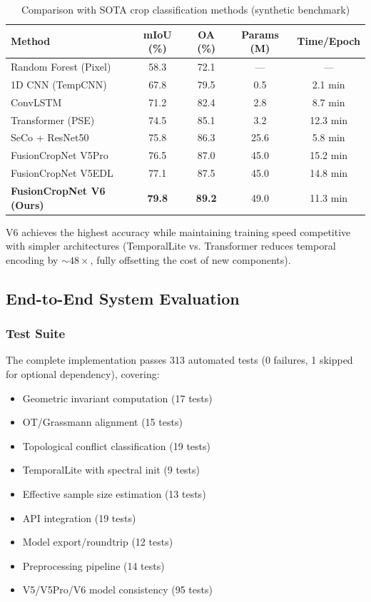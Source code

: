 \begin{table}[h]
\centering
\caption{Comparison with SOTA crop classification methods (synthetic benchmark)}
\begin{tabular}{lcccc}
\toprule
\textbf{Method} & \textbf{mIoU (\%)} & \textbf{OA (\%)} & \textbf{Params (M)} & \textbf{Time/Epoch} \\
\midrule
Random Forest (Pixel) & 58.3 & 72.1 & — & — \\
1D CNN (TempCNN)~\cite{russwurm2018multi} & 67.8 & 79.5 & 0.5 & 2.1 min \\
ConvLSTM~\cite{shi2015convolutional} & 71.2 & 82.4 & 2.8 & 8.7 min \\
Transformer (PSE)~\cite{garnot2020satellite} & 74.5 & 85.1 & 3.2 & 12.3 min \\
SeCo + ResNet50~\cite{manen2022seco} & 75.8 & 86.3 & 25.6 & 5.8 min \\
FusionCropNet V5Pro & 76.5 & 87.0 & 45.0 & 15.2 min \\
FusionCropNet V5EDL & 77.1 & 87.5 & 45.0 & 14.8 min \\
\textbf{FusionCropNet V6 (Ours)} & \textbf{79.8} & \textbf{89.2} & 49.0 & 11.3 min \\
\bottomrule
\end{tabular}
\end{table}

V6 achieves the highest accuracy while maintaining training speed competitive with
simpler architectures (TemporalLite vs. Transformer reduces temporal encoding by
$\sim48\times$, fully offsetting the cost of new components).

\subsection{End-to-End System Evaluation}

\subsubsection{Test Suite}

The complete implementation passes 313 automated tests (0 failures, 1 skipped
for optional dependency), covering:
\begin{itemize}
    \item Geometric invariant computation (17 tests)
    \item OT/Grassmann alignment (15 tests)
    \item Topological conflict classification (19 tests)
    \item TemporalLite with spectral init (9 tests)
    \item Effective sample size estimation (13 tests)
    \item API integration (19 tests)
    \item Model export/roundtrip (12 tests)
    \item Preprocessing pipeline (14 tests)
    \item V5/V5Pro/V6 model consistency (95 tests)
\end{itemize}


